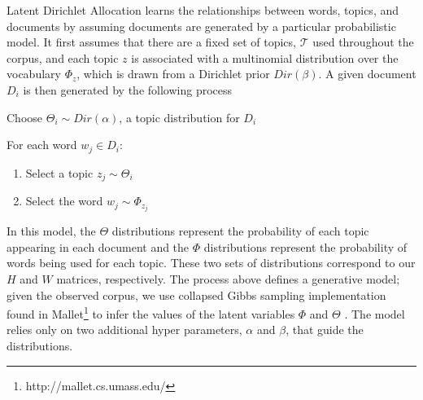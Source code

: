Latent Dirichlet Allocation \cite{blei03lda} learns the relationships
between words, topics, and documents by assuming documents are generated by a
particular probabilistic model.  It first assumes that there are a fixed set of
topics, $\mathcal{T}$ used throughout the corpus, and each topic $z$ is associated with a
multinomial distribution over the vocabulary $\Phi_{z}$, which is drawn from a
Dirichlet prior $Dir(\beta)$.  A given document $D_i$ is then generated by the
following process
\begin{enumerate}
{\small
\item Choose $\Theta_i \sim Dir(\alpha)$, a topic distribution for $D_i$
\item For each word $w_j \in D_i$:
  \begin{enumerate}
  \item Select a topic $z_j \sim \Theta_i$
  \item Select the word $w_j \sim \Phi_{z_j}$
  \end{enumerate}
}
\end{enumerate}
  
In this model, the $\Theta$ distributions represent the probability of each
topic appearing in each document and the $\Phi$ distributions represent the
probability of words being used for each topic.  These two sets of distributions
correspond to our $H$ and $W$ matrices, respectively.  The process above defines
a generative model; given the observed corpus, we use collapsed Gibbs sampling
implementation found in Mallet\footnote{http://mallet.cs.umass.edu/} to infer
the values of the latent variables $\Phi$ and $\Theta$
\cite{griffiths_steyvers04}.  The model relies only on two additional hyper
parameters, $\alpha$ and $\beta$,  that guide the distributions.

